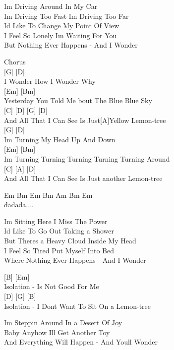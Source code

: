 \documentclass[
  letterpaper,
]{scrbook}
\begin{document}
I\textquotesingle m Driving Around In My Car\\
I\textquotesingle m Driving Too Fast I\textquotesingle m Driving Too
Far\\
I\textquotesingle d Like To Change My Point Of View\\
I Feel So Lonely I\textquotesingle m Waiting For You\\
But Nothing Ever Happens - And I Wonder

Chorus\\
{[}G{]} {[}D{]}\\
I Wonder How I Wonder Why\\
{[}Em{]} {[}Bm{]}\\
Yesterday You Told Me \textquotesingle bout The Blue Blue Sky\\
{[}C{]} {[}D{]} {[}G{]} {[}D{]}\\
And All That I Can See Is Just{[}A{]}Yellow Lemon-tree\\
{[}G{]} {[}D{]}\\
I\textquotesingle m Turning My Head Up And Down\\
{[}Em{]} {[}Bm{]}\\
I\textquotesingle m Turning Turning Turning Turning Turning Around\\
{[}C{]} {[}A{]} {[}D{]}\\
And All That I Can See Is Just another Lemon-tree

Em Bm Em Bm Am Bm Em\\
dadada....

I\textquotesingle m Sitting Here I Miss The Power\\
I\textquotesingle d Like To Go Out Taking a Shower\\
But There\textquotesingle s a Heavy Cloud Inside My Head\\
I Feel So Tired Put Myself Into Bed\\
Where Nothing Ever Happens - And I Wonder

{[}B{]} {[}Em{]}\\
Isolation - Is Not Good For Me\\
{[}D{]} {[}G{]} {[}B{]}\\
Isolation - I Don\textquotesingle t Want To Sit On a Lemon-tree

I\textquotesingle m Steppin\textquotesingle{} Around In a Desert Of
Joy\\
Baby Anyhow I\textquotesingle ll Get Another Toy\\
And Everything Will Happen - And You\textquotesingle ll Wonder
\end{document}
